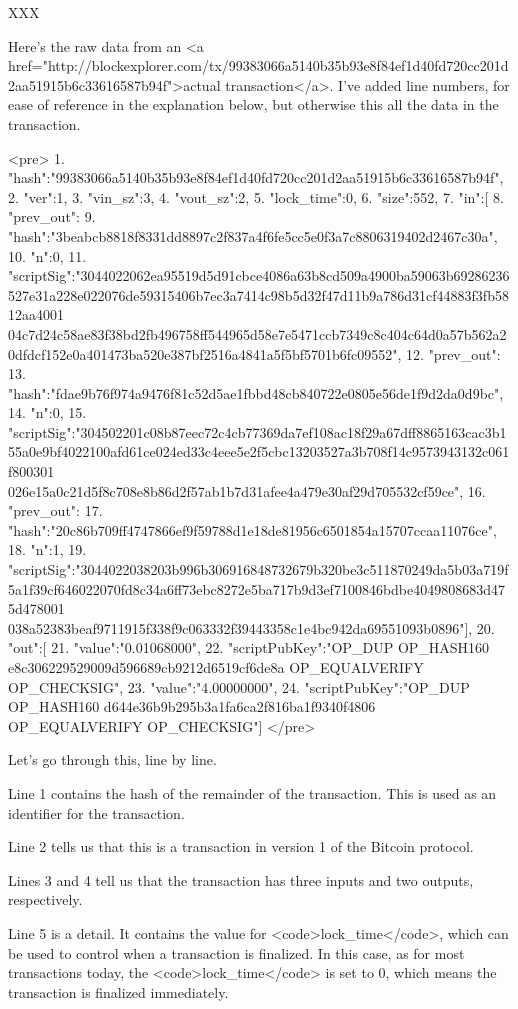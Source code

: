 XXX



Here's the raw data from an <a
href="http://blockexplorer.com/tx/99383066a5140b35b93e8f84ef1d40fd720cc201d2aa51915b6c33616587b94f">actual
transaction</a>.  I've added line numbers, for ease of reference in
the explanation below, but otherwise this all the data in the
transaction.

<pre>
1. {"hash":"99383066a5140b35b93e8f84ef1d40fd720cc201d2aa51915b6c33616587b94f",
2. "ver":1,
3. "vin_sz":3,
4.  "vout_sz":2,
5.  "lock_time":0,
6.  "size":552,
7.  "in":[
8.    {"prev_out":{
9.      "hash":"3beabcb8818f8331dd8897c2f837a4f6fe5cc5e0f3a7c8806319402d2467c30a",
10.        "n":0},
11.     "scriptSig":"3044022062ea95519d5d91cbce4086a63b8cd509a4900ba59063b69286236527e31a228e022076de59315406b7ec3a7414c98b5d32f47d11b9a786d31cf44883f3fb5812aa4001 04c7d24c58ae83f38bd2fb496758ff544965d58e7e5471ccb7349c8c404c64d0a57b562a20dfdcf152e0a401473ba520e387bf2516a4841a5f5bf5701b6fc09552"},
12.    {"prev_out":{
13.        "hash":"fdae9b76f974a9476f81c52d5ae1fbbd48cb840722e0805e56de1f9d2da0d9bc",
14.        "n":0},
15.      "scriptSig":"304502201c08b87eec72c4cb77369da7ef108ac18f29a67dff8865163cac3b155a0e9bf4022100afd61ce024ed33c4eee5e2f5cbc13203527a3b708f14c9573943132c061f800301 026e15a0c21d5f8c708e8b86d2f57ab1b7d31afee4a479e30af29d705532cf59ce"},
16.    {"prev_out":{
17.        "hash":"20c86b709ff4747866ef9f59788d1e18de81956c6501854a15707ccaa11076ce",
18.        "n":1},
19.      "scriptSig":"3044022038203b996b306916848732679b320be3c511870249da5b03a719f5a1f39cf646022070fd8c34a6ff73ebc8272e5ba717b9d3ef7100846bdbe4049808683d475d478001 038a52383beaf9711915f338f9c063332f39443358c1e4bc942da69551093b0896"}],
20.  "out":[
21.    {"value":"0.01068000",
22.      "scriptPubKey":"OP_DUP OP_HASH160 e8c306229529009d596689cb9212d6519cf6de8a OP_EQUALVERIFY OP_CHECKSIG"},
23.    {"value":"4.00000000",
24.      "scriptPubKey":"OP_DUP OP_HASH160 d644e36b9b295b3a1fa6ca2f816ba1f9340f4806 OP_EQUALVERIFY OP_CHECKSIG"}]}
</pre>

Let's go through this, line by line.

Line 1 contains the hash of the remainder of the transaction.  This is
used as an identifier for the transaction.

Line 2 tells us that this is a transaction in version 1 of the Bitcoin
protocol.

Lines 3 and 4 tell us that the transaction has three inputs and two
outputs, respectively.

Line 5 is a detail.  It contains the value for <code>lock_time</code>,
which can be used to control when a transaction is finalized.  In this
case, as for most transactions today, the <code>lock_time</code> is
set to 0, which means the transaction is finalized immediately.

